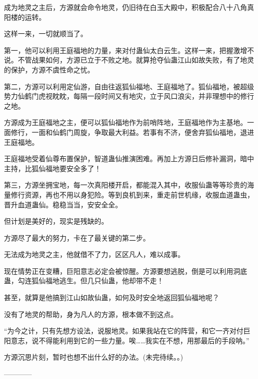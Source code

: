 \begin{this_body}
成为地灵之主后，方源就会命令地灵，仍旧待在白玉大殿中，积极配合八十八角真阳楼的运转。

这样一来，一切就顺当了。

第一，他可以利用王庭福地的力量，来对付蛊仙太白云生。这样一来，把握激增不说。不管战果如何，方源已立于不败之地。就算抢夺仙蛊江山如故失败，有了地灵的保护，方源不虞性命之忧。

第二，方源可以利用定仙游，自由往返狐仙福地、王庭福地了。狐仙福地，被超级势力仙鹤门虎视眈眈，每隔一段时间又有地灾，立于风口浪尖，并非理想中的修行之地。

方源成为王庭福地之主，便可以狐仙福地作为前哨阵地，王庭福地作为主基地。一面修行，一面和仙鹤门周旋，争取最大利益。若事有不济，便舍弃狐仙福地，退进王庭福地。

王庭福地受着仙尊布置保护，智道蛊仙推演困难。再加上方源日后修补漏洞，暗中主持，比狐仙福地要安全多了！

第三，方源坐拥宝地，每一次真阳楼开启，都能混入其中，收服仙蛊等等珍贵的海量修行资源，再也不用以身犯险。等到良机到来，重走前世机缘，收服血道蛊虫，晋升血道蛊仙。稳稳当当，安安全全。

但计划是美好的，现实是残缺的。

方源尽了最大的努力，卡在了最关键的第二步。

无法成为地灵之主，他就借不了力，区区凡人，难以成事。

现在情势正在变糟，巨阳意志必定会被惊醒。方源要想逃脱，倒是可以利用洞底蛊，勾连狐仙福地逃生。但几只仙蛊，他却带不走！

甚至，就算是他搞到江山如故仙蛊，如何及时安全地返回狐仙福地呢？

没有了地灵的帮助，身为凡人的方源，根本做不到这点。

“为今之计，只有先想方设法，说服地灵。如果我站在它的阵营，和它一齐对付巨阳意志，说不得能利用到它的一些力量。唉……我实在不想，用那最后的手段呐。”

方源沉思片刻，暂时也想不出什么好的办法。(未完待续。。)

------------

\end{this_body}

